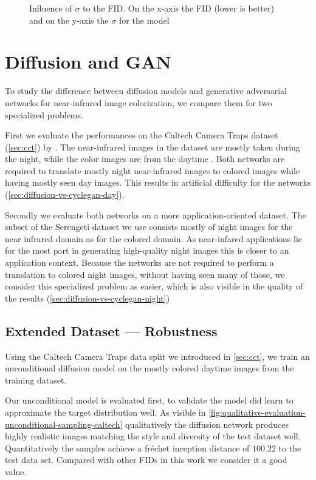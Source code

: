 \begin{figure}[htp!]
    \caption{Influence of $\sigma$ to the FID. On the x-axis the FID (lower is better) and on the y-axis the $\sigma$ for the model}
    \label{fig:quantitative-evaluation-influence-of-sigma-to-fid}
\end{figure}



\section{Diffusion and GAN}
\label{sec:diffusion-vs-cyclegan}
To study the difference between diffusion models and generative adversarial networks for near-infrared image colorization, we compare them for two specialized problems.

First we evaluate the performances on the Caltech Camera Traps dataset (\autoref{sec:cct}) by .
The near-infrared images in the dataset are mostly taken during the night, while the color images are from the daytime \parencite{caltech}.
Both networks are required to translate mostly night near-infrared images to colored images while having mostly seen day images.
This results in artificial difficulty for the networks (\autoref{sec:diffusion-vs-cyclegan-day}).

Secondly we evaluate both networks on a more application-oriented dataset.
The subset of the Serengeti dataset we use consists mostly of night images for the near infrared domain as for the colored domain.
As near-infared applications lie for the most part in generating high-quality night images this is closer to an application context.
Because the networks are not required to perform a translation to colored night images, without having seen many of those, we consider
this specialized problem as easier, which is also visible in the quality of the results (\autoref{sec:diffusion-vs-cyclegan-night})

\subsection{Extended Dataset --- Robustness}
\label{sec:diffusion-vs-cyclegan-day}
Using the Caltech Camera Traps data split we introduced in \autoref{sec:cct},
we train an unconditional diffusion model on the mostly colored daytime images from the training dataset.

Our unconditional model is evaluated first, to validate the model did learn to approximate the target distribution well.
As visible in \autoref{fig:qualitative-evaluation-unconditional-sampling-caltech} qualitatively the diffusion network
produces highly realistic images matching the style and diversity of the test dataset well.
Quantitatively the samples achieve a fréchet inception distance of $100.22$ to the test data set.
Compared with other FIDs in this work we consider it a good value.

